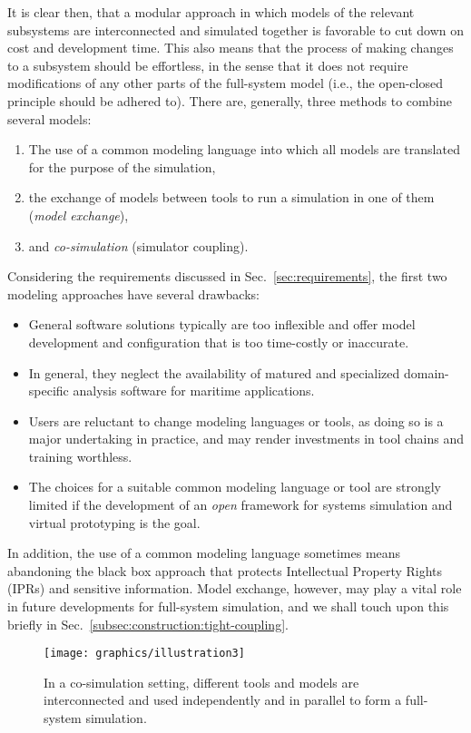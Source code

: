 \documentclass[prb,aps,showpacs,floatfix,twocolumn,10pt]{revtex4-1}
\newlength{\graphicswidth}
\theoremstyle{plain}
\theoremstyle{remark}
\begin{document}
It is clear then, that a modular approach in which models of the relevant subsystems are interconnected and simulated together is favorable to cut down on cost and development time.
This also means that the process of making changes to a subsystem should be effortless, in the sense that it does not require modifications of any other parts of the full-system model (i.e., the open-closed principle should be adhered to).
There are, generally, three methods to combine several models:
\begin{enumerate}
	\item \label{itm:modelstrategy1} The use of a common modeling language into which all models are translated for the purpose of the simulation,
	\item \label{itm:modelstrategy2} the exchange of models between tools to run a simulation in one of them (\emph{model exchange}),
	\item \label{itm:modelstrategy3} and \emph{co-simulation} (simulator coupling).
\end{enumerate}
Considering the requirements discussed in Sec.~\ref{sec:requirements}, the first two modeling approaches have several drawbacks:
\begin{itemize}
	\item General software solutions typically are too inflexible and offer model development and configuration that is too time-costly or inaccurate.
	\item In general, they neglect the availability of matured and specialized domain-specific analysis software for maritime applications.
	\item Users are reluctant to change modeling languages or tools, as doing so is a major undertaking in practice, and may render investments in tool chains and training worthless.
	\item The choices for a suitable common modeling language or tool are strongly limited if the development of an \emph{open} framework for systems simulation and virtual prototyping is the goal.
\end{itemize}
In addition, the use of a common modeling language sometimes means abandoning the black box approach that protects Intellectual Property Rights (IPRs) and sensitive information.
Model exchange, however, may play a vital role in future developments for full-system simulation, and we shall touch upon this briefly in Sec.~\ref{subsec:construction:tight-coupling}.

\begin{figure}[h!tb]
	\texttt{[image: graphics/illustration3]}
	\caption{%
	In a co-simulation setting, different tools and models are interconnected and used independently and in parallel to form a full-system simulation.
	}
	\label{fig:tools_coupled}
\end{figure}
\end{document}
